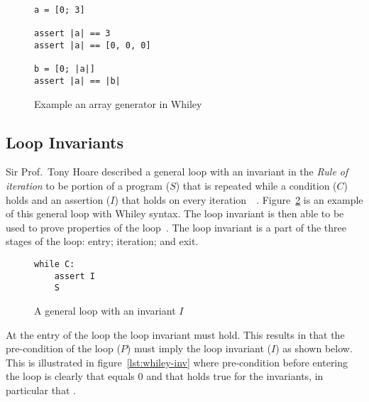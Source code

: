 \begin{figure}[ht]
\begin{lstlisting}
a = [0; 3]

assert |a| == 3
assert |a| == [0, 0, 0]

b = [0; |a|]
assert |a| == |b|
\end{lstlisting}
    \caption{Example an array generator in Whiley}
    \label{lst:whiley-array-gen}
\end{figure}

\subsection{Loop Invariants}

Sir Prof.\ Tony Hoare described a general loop with an invariant in
the \textit{Rule of iteration} to be
portion of a program ($S$) that is repeated while a condition ($C$)
holds and an assertion ($I$) that holds on every
iteration~\cite{hoare-logic}~\cite{loop-inv-survey}.
Figure~\ref{lst:general-loop} is an example of this general loop with Whiley
syntax.
The loop invariant is then able to be used to prove properties of the
loop~\cite{loop-inv-survey}.
The loop invariant is a part of the three stages of the loop: entry;
iteration; and exit.

\begin{figure}[ht]
\begin{lstlisting}
while C:
    assert I
    S
\end{lstlisting}
    \caption{A general loop with an invariant $I$}
    \label{lst:general-loop}
\end{figure}

At the entry of the loop the loop invariant must hold.
This results in that the pre-condition of the loop ($P$) must imply
the loop invariant ($I$) as shown below.
This is illustrated in figure~\ref{lst:whiley-inv} where pre-condition
before entering the loop is clearly that  equals 0 and that holds
true for the invariants, in particular that .

